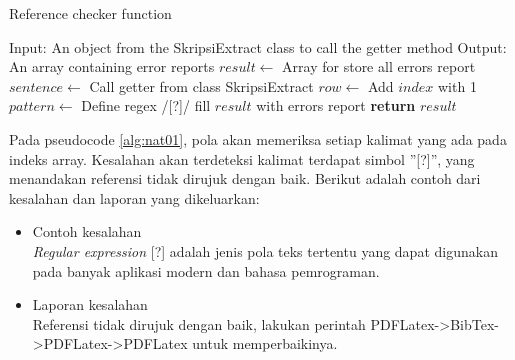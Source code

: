 \begin{enumerate}
\begin{minipage}{1.0\linewidth}
\begin{algorithm}[H]
    \caption{Reference checker function}
	\label{alg:nat01}
	\begin{algorithmic}[1]
    		\State Input: An object from the SkripsiExtract class to call the getter method
			\State Output: An array containing error reports
			\State $result \gets$ Array for store all errors report
			\State $sentence \gets$ Call getter from class SkripsiExtract
    			\State $row \gets$ Add $index$ with 1
				\State $pattern \gets$ Define regex /[?]/
                	\State fill $result$ with errors report
            	\EndIf
        	\EndFor
    		\State \textbf{return} $result$
    	\EndFunction
	\end{algorithmic}
\end{algorithm}
\end{minipage}
\medskip

	Pada pseudocode \ref{alg:nat01}, pola akan memeriksa setiap kalimat yang ada pada indeks array. Kesalahan akan terdeteksi kalimat terdapat simbol ''[?]'', yang menandakan referensi tidak dirujuk dengan baik. Berikut adalah contoh dari kesalahan dan laporan yang dikeluarkan:
	
	\begin{itemize}
		\item Contoh kesalahan \\
		\textit{Regular expression} [?] adalah jenis pola teks tertentu yang dapat digunakan pada banyak aplikasi modern dan bahasa pemrograman.
		\item Laporan kesalahan \\
		Referensi tidak dirujuk dengan baik, lakukan perintah PDFLatex->BibTex->PDFLatex->PDFLatex untuk memperbaikinya.
	\end{itemize}		
	
\end{enumerate}